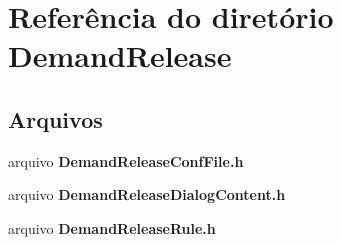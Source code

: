 \section{Referência do diretório Demand\+Release}
\label{dir_acce4ab6e1f7a9d30b97af3ac9f49e32}
\subsection*{Arquivos}
\begin{DoxyCompactItemize}
\item 
arquivo {\bf Demand\+Release\+Conf\+File.\+h}
\item 
arquivo {\bf Demand\+Release\+Dialog\+Content.\+h}
\item 
arquivo {\bf Demand\+Release\+Rule.\+h}
\end{DoxyCompactItemize}

